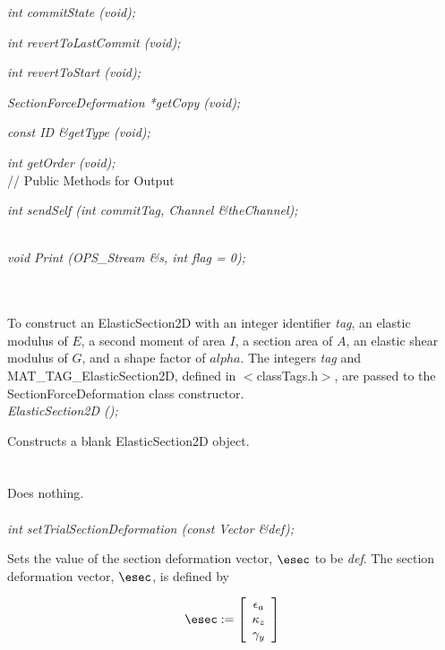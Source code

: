 {\em int commitState (void); } 

{\em int revertToLastCommit (void); } 

{\em int revertToStart (void); } 

{\em SectionForceDeformation *getCopy (void); } 

{\em const ID \&getType (void); } 

{\em int getOrder (void); } \\ 

// Public Methods for Output

{\em int sendSelf (int commitTag, Channel \&theChannel); }

\\
{\em void Print (OPS_Stream \&s, int flag = 0);} 


  \\
  \\
To construct an ElasticSection2D with an integer identifier {\em
tag}, an elastic modulus of $E$, a second moment of area $I$,
a section area of $A$, an elastic shear modulus of $G$, and a shape factor
of $alpha$. The integers {\em tag} and MAT\_TAG\_ElasticSection2D, defined in
$<$classTags.h$>$, are passed to the SectionForceDeformation
class constructor. \\

{\em ElasticSection2D ();} 

Constructs a blank ElasticSection2D object. \\

 \\
 \\ 
Does nothing. \\

 \\
{\em int setTrialSectionDeformation (const Vector \&def); }  

Sets the value of the section deformation vector, $\esec$ to be {\em
def}. The section deformation vector, $\esec$, is defined by

\begin{equation}
\esec := \left[
   \begin{array}{c}
       \epsilon_a \\
       \kappa_z   \\
       \gamma_y
   \end{array} 
 \right]
\end{equation}

